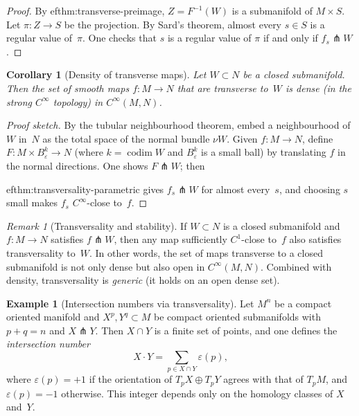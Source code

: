 \documentclass[12pt,a4paper,openany]{book}
\newtheorem{corollary}[theorem]{Corollary}
\theoremstyle{definition}
\newtheorem{example}[theorem]{Example}
\theoremstyle{remark}
\newtheorem{remark}[theorem]{Remark}
\begin{document}
\begin{proof}
By 
ef{thm:transverse-preimage}, $Z = F^{-1}(W)$ is a submanifold
of $M\times S$.  Let $\pi\colon Z\to S$ be the projection.  By Sard's
theorem, almost every $s\in S$ is a regular value of~$\pi$.  One checks
that $s$ is a regular value of $\pi$ if and only if $f_s\pitchfork W$.
\end{proof}

\begin{corollary}[Density of transverse maps]\label{cor:transverse-dense}
Let $W\subset N$ be a closed submanifold.  Then the set of smooth maps
$f\colon M\to N$ that are transverse to~$W$ is dense (in the strong
$C^\infty$ topology) in $C^\infty(M,N)$.
\end{corollary}

\begin{proof}[Proof sketch]
By the tubular neighbourhood theorem, embed a neighbourhood of $W$ in~$N$
as the total space of the normal bundle $\nu W$.  Given $f\colon M\to N$,
define $F\colon M\times B_\varepsilon^k\to N$ (where $k = \operatorname{codim}W$
and $B_\varepsilon^k$ is a small ball) by translating $f$ in the normal
directions.  One shows $F\pitchfork W$; then

ef{thm:transversality-parametric} gives $f_s\pitchfork W$ for
almost every~$s$, and choosing $s$ small makes $f_s$ $C^\infty$-close
to~$f$.
\end{proof}

\begin{remark}[Transversality and stability]\label{rem:transversality-stability}
If $W\subset N$ is a closed submanifold and $f\colon M\to N$ satisfies
$f\pitchfork W$, then any map sufficiently $C^1$-close to~$f$ also
satisfies transversality to~$W$.  In other words, the set of maps
transverse to a closed submanifold is not only dense but also open
in $C^\infty(M,N)$.  Combined with density, transversality is
\emph{generic} (it holds on an open dense set).
\end{remark}

\begin{example}[Intersection numbers via transversality]\label{ex:intersection-number}
Let $M^n$ be a compact oriented manifold and $X^p, Y^q\subset M$ be
compact oriented submanifolds with $p + q = n$ and $X\pitchfork Y$.
Then $X\cap Y$ is a finite set of points, and one defines the
\emph{intersection number}
\[
  X\cdot Y = \sum_{p\in X\cap Y} \varepsilon(p),
\]
where $\varepsilon(p) = +1$ if the orientation of $T_pX\oplus T_pY$
agrees with that of $T_pM$, and $\varepsilon(p) = -1$ otherwise.
This integer depends only on the homology classes of $X$ and~$Y$.
\end{example}
\end{document}
